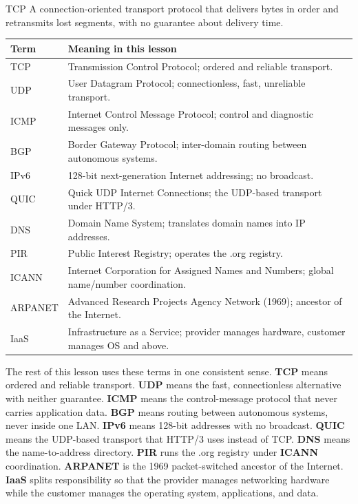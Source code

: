 \begin{definitionbox}{TCP}
A connection-oriented transport protocol that delivers bytes in order and
retransmits lost segments, with no guarantee about delivery time.
\end{definitionbox}

\begin{center}
\begin{tabular}{p{}p{}}
\toprule
\textbf{Term} & \textbf{Meaning in this lesson} \\
\midrule
TCP & Transmission Control Protocol; ordered and reliable transport. \\
UDP & User Datagram Protocol; connectionless, fast, unreliable transport. \\
ICMP & Internet Control Message Protocol; control and diagnostic messages only. \\
BGP & Border Gateway Protocol; inter-domain routing between autonomous systems. \\
IPv6 & 128-bit next-generation Internet addressing; no broadcast. \\
QUIC & Quick UDP Internet Connections; the UDP-based transport under HTTP/3. \\
DNS & Domain Name System; translates domain names into IP addresses. \\
PIR & Public Interest Registry; operates the .org registry. \\
ICANN & Internet Corporation for Assigned Names and Numbers; global name/number coordination. \\
ARPANET & Advanced Research Projects Agency Network (1969); ancestor of the Internet. \\
IaaS & Infrastructure as a Service; provider manages hardware, customer manages OS and above. \\
\bottomrule
\end{tabular}
\end{center}

The rest of this lesson uses these terms in one consistent sense. \textbf{TCP}
means ordered and reliable transport. \textbf{UDP} means the fast,
connectionless alternative with neither guarantee. \textbf{ICMP} means the
control-message protocol that never carries application data.
\textbf{BGP} means routing between autonomous systems, never inside one LAN.
\textbf{IPv6} means 128-bit addresses with no broadcast. \textbf{QUIC} means
the UDP-based transport that HTTP/3 uses instead of TCP. \textbf{DNS} means
the name-to-address directory. \textbf{PIR} runs the .org registry under
\textbf{ICANN} coordination. \textbf{ARPANET} is the 1969 packet-switched
ancestor of the Internet. \textbf{IaaS} splits responsibility so that the
provider manages networking hardware while the customer manages the operating
system, applications, and data.


